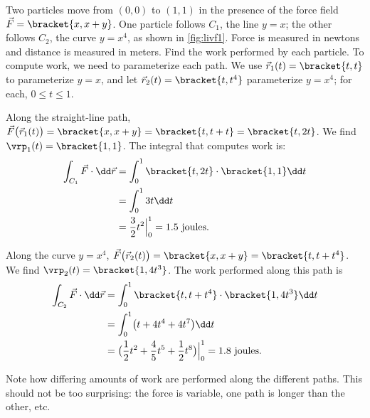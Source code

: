 \begin{example}\label{ex_livf1}%
%
%
Two particles move from $(0,0)$ to $(1,1)$ in the presence of the force field $\vec F  =\bracket{x,x+y}$. One particle follows $C_1$, the line $y=x$; the other follows $C_2$, the curve $y=x^4$, as shown in \autoref{fig:livf1}. Force is measured in newtons and distance is measured in meters. Find the work performed by each particle.
\solution
To compute work, we need to parameterize each path. We use $\vec r_1(t) =\bracket{t,t}$ to parameterize $y=x$, and let $\vec r_2(t) =\bracket{t,t^4}$ parameterize $y=x^4$; for each, $0\leq t\leq 1$. 

Along the straight-line path, $\vec F\bigl(\vec r_1(t)\bigr) =\bracket{x,x+y}=\bracket{t,t+t}=\bracket{t,2t}$. We find $\vrp_1(t) =\bracket{1,1}$. The integral that computes work is:
\begin{align*}
	\int_{C_1} \vec F\cdot\dd\vec r
	&= \int_0^1\bracket{t,2t}\cdot\bracket{1,1}\dd t \\
	&= \int_0^1 3t\dd t \\
	&= \frac32t^2\Big|_0^1 = 1.5 \text{ joules}.
\end{align*}

Along the curve $y = x^4$, $\vec F\bigl(\vec r_2(t)\bigr) =\bracket{x,x+y}=\bracket{t,t+t^4}$. We find $\vrp_2(t) =\bracket{1,4t^3}$. The work performed along this path is
\begin{align*}
	\int_{C_2} \vec F\cdot\dd\vec r
	&= \int_0^1\bracket{t,t+t^4}\cdot\bracket{1,4t^3}\dd t\\
	&= \int_0^1 \bigl(t + 4t^4+ 4t^7\bigr)\dd t \\
	&= \bigl(\frac12t^2 + \frac45t^5 + \frac12t^8\bigr)\Big|_0^1 =  1.8 \text{ joules}.
\end{align*}

Note how differing amounts of work are performed along the different paths. This should not be too surprising: the force is variable, one path is longer than the other, etc.
\end{example}

